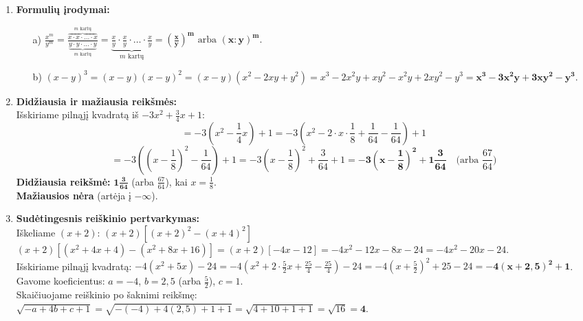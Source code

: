 \documentclass[12pt,a4paper]{article}
\begin{document}
\begin{enumerate}
    \vspace{0.3cm}
    \item \textbf{Formulių įrodymai:}
    \begin{itemize}
        \item[a)] $\frac{x^m}{y^m} = \frac{\overbrace{x \cdot x \cdot \dots \cdot x}^{m \text{ kartų}}}{\underbrace{y \cdot y \cdot \dots \cdot y}_{m \text{ kartų}}} = \underbrace{\frac{x}{y} \cdot \frac{x}{y} \cdot \dots \cdot \frac{x}{y}}_{m \text{ kartų}} = \mathbf{\left(\frac{x}{y}\right)^m} \text{ arba } \mathbf{(x : y)^m}.$
        \item[b)] $(x-y)^3 = (x-y)(x-y)^2 = (x-y)(x^2 - 2xy + y^2) = x^3 - 2x^2y + xy^2 - x^2y + 2xy^2 - y^3 = \mathbf{x^3 - 3x^2y + 3xy^2 - y^3}.$
    \end{itemize}

    \vspace{0.3cm}
    \item \textbf{Didžiausia ir mažiausia reikšmės:} \\
    Išskiriame pilnąjį kvadratą iš $-3x^2 + \frac{3}{4}x + 1$:
    $$ = -3\left(x^2 - \frac{1}{4}x\right) + 1 = -3\left(x^2 - 2 \cdot x \cdot \frac{1}{8} + \frac{1}{64} - \frac{1}{64}\right) + 1 $$
    $$ = -3\left(\left(x - \frac{1}{8}\right)^2 - \frac{1}{64}\right) + 1 = -3\left(x - \frac{1}{8}\right)^2 + \frac{3}{64} + 1 = \mathbf{-3\left(x - \frac{1}{8}\right)^2 + 1\frac{3}{64}} \quad \text{(arba $\frac{67}{64}$)} $$
    \textbf{Didžiausia reikšmė:} $\mathbf{1\frac{3}{64}}$ (arba $\frac{67}{64}$), kai $x = \frac{1}{8}$. \\
    \textbf{Mažiausios nėra} (artėja į $-\infty$).

    \vspace{0.3cm}
    \item \textbf{Sudėtingesnis reiškinio pertvarkymas:} \\
    Iškeliame $(x+2)$: $(x+2)\left[ (x+2)^2 - (x+4)^2 \right]$ \\
    $(x+2) [ (x^2 + 4x + 4) - (x^2 + 8x + 16) ] = (x+2)[ -4x - 12 ] = -4x^2 - 12x - 8x - 24 = -4x^2 - 20x - 24$. \\
    Išskiriame pilnąjį kvadratą: $-4\left(x^2 + 5x\right) - 24 = -4\left(x^2 + 2 \cdot \frac{5}{2}x + \frac{25}{4} - \frac{25}{4}\right) - 24 = -4\left(x + \frac{5}{2}\right)^2 + 25 - 24 = \mathbf{-4\left(x + 2,5\right)^2 + 1}$. \\
    Gavome koeficientus: $a = -4$, $b = 2,5$ (arba $\frac{5}{2}$), $c = 1$. \\
    Skaičiuojame reiškinio po šaknimi reikšmę: \\
    $\sqrt{-a + 4b + c + 1} = \sqrt{-(-4) + 4(2,5) + 1 + 1} = \sqrt{4 + 10 + 1 + 1} = \sqrt{16} = \mathbf{4}$.


\end{enumerate}
\end{document}
